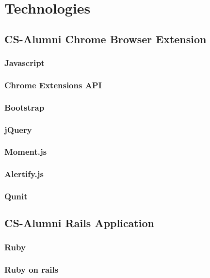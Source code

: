 \documentclass{article}
\begin{document}
\newpage
\section*{Technologies}

\subsection{CS-Alumni Chrome Browser Extension}

\subsubsection{Javascript}

\subsubsection{Chrome Extensions API}

\subsubsection{Bootstrap}

\subsubsection{jQuery}

\subsubsection{Moment.js}

\subsubsection{Alertify.js}

\subsubsection{Qunit}

\subsection{CS-Alumni Rails Application}

\subsubsection{Ruby}

\subsubsection{Ruby on rails}
\end{document}
